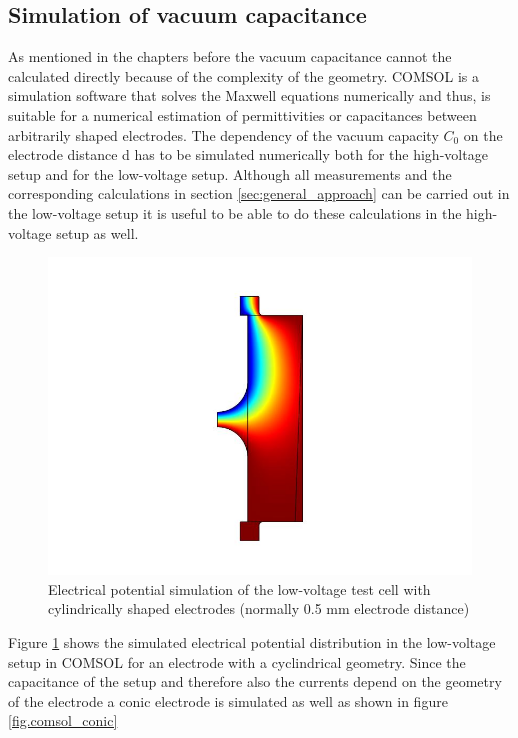 \subsection{Simulation of vacuum capacitance} 
\label{sec.sim_vac_comsol}
As mentioned in the chapters before the vacuum capacitance cannot the calculated directly because of the complexity of the geometry. COMSOL is a simulation software that solves the Maxwell equations numerically and thus, is suitable for a numerical estimation of permittivities or capacitances between arbitrarily shaped electrodes. The dependency of the vacuum capacity $C_0$ on the electrode distance d has to be simulated numerically both for the high-voltage setup and for the low-voltage setup. Although all measurements and the corresponding calculations in section \ref{sec:general_approach} can be carried out in the low-voltage setup it is useful to be able to do these calculations in the high-voltage setup as well. 


\begin{figure}[htbp]
	\centering
	\includegraphics{figures/COMSOL_Beispielbild.jpg}		
	\caption[Kurze Abbildungsbeschreibung]{Electrical potential simulation of the low-voltage test cell with cylindrically shaped electrodes (normally 0.5 mm electrode distance)} \label{fig.comsol_beispiel}

\end{figure}
 
Figure \ref{fig.comsol_beispiel} shows the simulated electrical potential distribution in the low-voltage setup in COMSOL for an electrode with a cyclindrical geometry. Since the capacitance of the setup and therefore also the currents depend on the geometry of the electrode a conic electrode is simulated as well as shown in figure  \ref{fig.comsol_conic}

